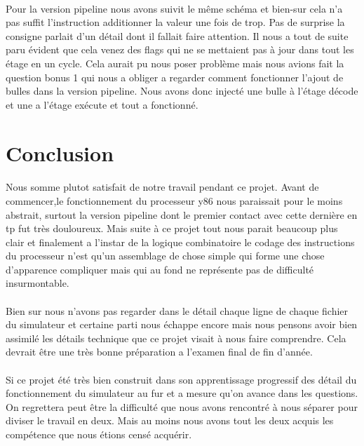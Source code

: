 \documentclass[12pt]{article}
\begin{document}
\paragraph{}Pour la version pipeline nous avons suivit le même schéma et bien-sur cela n'a pas suffit l'instruction additionner la valeur une fois de trop. Pas de surprise la consigne parlait d'un détail dont il fallait faire attention. Il nous a tout de suite paru évident que cela venez des flags qui ne se mettaient pas à jour dans tout les étage en un cycle. Cela aurait pu nous poser problème mais nous avions fait la question bonus 1 qui nous a obliger a regarder comment fonctionner l'ajout de bulles dans la version pipeline. Nous avons donc injecté une bulle à l'étage décode et une a l'étage exécute et tout a fonctionné.

\newpage

\section{Conclusion}

\paragraph{} Nous somme plutot satisfait de notre travail pendant ce projet. Avant de commencer,le fonctionnement du processeur y86 nous paraissait pour le moins abstrait, surtout la version pipeline dont le premier contact avec cette dernière en tp fut très douloureux. Mais suite à ce projet tout nous parait beaucoup plus clair et finalement a l'instar de la logique combinatoire le codage des instructions du processeur n'est qu'un assemblage de chose simple qui forme une chose d'apparence compliquer mais qui au fond ne représente pas de difficulté insurmontable.

\paragraph{} Bien sur nous n'avons pas regarder dans le détail chaque ligne de chaque fichier du simulateur et certaine parti nous échappe encore mais nous pensons avoir bien assimilé les détails technique que ce projet visait à nous faire comprendre. Cela devrait être une très bonne préparation a l’examen final de fin d'année.

\paragraph{} Si ce projet été très bien construit dans son apprentissage progressif des détail du fonctionnement du simulateur au fur et a mesure qu'on avance dans les questions. On regrettera peut être la difficulté que nous avons rencontré à nous séparer pour diviser le travail en deux. Mais au moins nous avons tout les deux acquis les compétence que nous étions censé acquérir.
\end{document}
